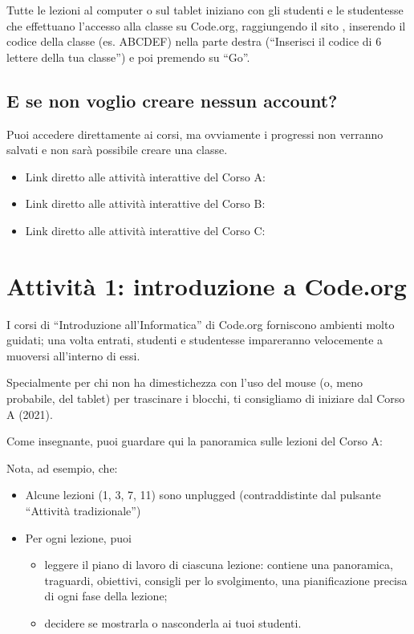 Tutte le lezioni al computer o sul tablet iniziano con gli studenti e le studentesse che effettuano l'accesso alla classe su Code.org, raggiungendo il sito , inserendo il codice della classe (es. ABCDEF) nella parte destra (``Inserisci il codice di 6 lettere della tua classe'') e poi premendo su ``Go''.


\subsection{E se non voglio creare nessun account?}


Puoi accedere direttamente ai corsi, ma ovviamente i progressi non verranno salvati e non sarà possibile creare una classe.


\begin{itemize}
  \item Link diretto alle attività interattive del Corso A: 
  \item Link diretto alle attività interattive del Corso B: 
  \item Link diretto alle attività interattive del Corso C: 
\end{itemize}


\section{Attività 1: introduzione a Code.org}

\ruoliattivita{\ruoloProgrammatore}

I corsi di ``Introduzione all'Informatica'' di Code.org forniscono ambienti molto guidati; una volta entrati, studenti e studentesse impareranno velocemente a muoversi all'interno di essi.

Specialmente per chi non ha dimestichezza con l'uso del mouse (o, meno probabile, del tablet) per trascinare i blocchi, ti consigliamo di iniziare dal Corso A (2021).

Come insegnante, puoi guardare qui la panoramica sulle lezioni del Corso A: 


Nota, ad esempio, che:

\begin{itemize}
\item
  Alcune lezioni (1, 3, 7, 11) sono unplugged (contraddistinte dal pulsante ``Attività tradizionale'')
\item
  Per ogni lezione, puoi

  \begin{itemize}
  \item
    leggere il piano di lavoro di ciascuna lezione: contiene una panoramica, traguardi, obiettivi, consigli per lo svolgimento, una pianificazione precisa di ogni fase della lezione;
  \item
    decidere se mostrarla o nasconderla ai tuoi studenti.
  \end{itemize}
\end{itemize}


